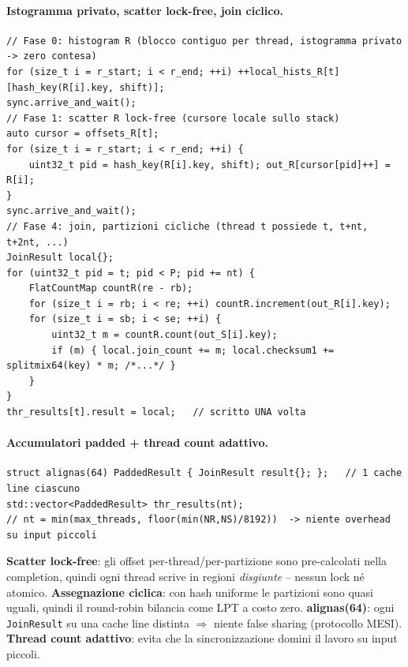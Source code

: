 \documentclass[11pt,a4paper]{article}
\begin{document}
\paragraph{Istogramma privato, scatter lock-free, join ciclico.}
\begin{lstlisting}[style=cpp]
// Fase 0: histogram R (blocco contiguo per thread, istogramma privato -> zero contesa)
for (size_t i = r_start; i < r_end; ++i) ++local_hists_R[t][hash_key(R[i].key, shift)];
sync.arrive_and_wait();
// Fase 1: scatter R lock-free (cursore locale sullo stack)
auto cursor = offsets_R[t];
for (size_t i = r_start; i < r_end; ++i) {
    uint32_t pid = hash_key(R[i].key, shift); out_R[cursor[pid]++] = R[i];
}
sync.arrive_and_wait();
// Fase 4: join, partizioni cicliche (thread t possiede t, t+nt, t+2nt, ...)
JoinResult local{};
for (uint32_t pid = t; pid < P; pid += nt) {
    FlatCountMap countR(re - rb);
    for (size_t i = rb; i < re; ++i) countR.increment(out_R[i].key);
    for (size_t i = sb; i < se; ++i) {
        uint32_t m = countR.count(out_S[i].key);
        if (m) { local.join_count += m; local.checksum1 += splitmix64(key) * m; /*...*/ }
    }
}
thr_results[t].result = local;   // scritto UNA volta
\end{lstlisting}

\paragraph{Accumulatori padded + thread count adattivo.}
\begin{lstlisting}[style=cpp]
struct alignas(64) PaddedResult { JoinResult result{}; };   // 1 cache line ciascuno
std::vector<PaddedResult> thr_results(nt);
// nt = min(max_threads, floor(min(NR,NS)/8192))  -> niente overhead su input piccoli
\end{lstlisting}

\begin{whybox}
\textbf{Scatter lock-free}: gli offset per-thread/per-partizione sono pre-calcolati nella completion, quindi ogni thread scrive in regioni \emph{disgiunte} -- nessun lock né atomico. \textbf{Assegnazione ciclica}: con hash uniforme le partizioni sono quasi uguali, quindi il round-robin bilancia come LPT a costo zero. \textbf{alignas(64)}: ogni \texttt{JoinResult} su una cache line distinta $\Rightarrow$ niente false sharing (protocollo MESI). \textbf{Thread count adattivo}: evita che la sincronizzazione domini il lavoro su input piccoli.
\end{whybox}
\end{document}
